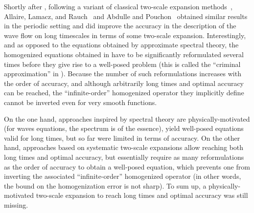 \documentclass[10pt]{amsart}
\theoremstyle{plain}
\theoremstyle{definition}
\numberwithin{equation}{section}
\begin{document}
Shortly after \cite{BG}, following a variant of classical two-scale expansion methods~\cite{BLP-78}, Allaire, Lamacz, and Rauch~\cite{ALR} and Abdulle and Pouchon~\cite{Pouch-17,Pouch-19}
obtained similar results in the periodic setting and did improve the accuracy in the description of the wave flow on long timescales in terms of some two-scale expansion.
Interestingly, and as opposed to the equations obtained by approximate spectral theory, the homogenized equations obtained in \cite{ALR,Pouch-17,Pouch-19} have to be significantly reformulated several times before they give rise to a well-posed problem (this is called the ``criminal approximation'' in \cite{ALR}). Because the number of such reformulations increases with the order of accuracy, and although arbitrarily long times and optimal accuracy can be reached,
the ``infinite-order'' homogenized operator they implicitly define cannot be inverted even for very smooth functions.

On the one hand, approaches inspired by spectral theory are physically-motivated (for waves equations, the spectrum is of the essence), yield well-posed equations valid for long times, but so far were limited in terms of accuracy. On the other hand, approaches based on systematic two-scale expansions allow { reaching} both long times and optimal accuracy, but essentially require as many reformulations as the order of accuracy to obtain a well-posed equation, which prevents one from inverting the associated ``infinite-order'' homogenized operator (in other words, the bound on the homogenization error is not sharp).
To sum up, a physically-motivated two-scale expansion to reach long times and optimal accuracy was still missing.
\end{document}
